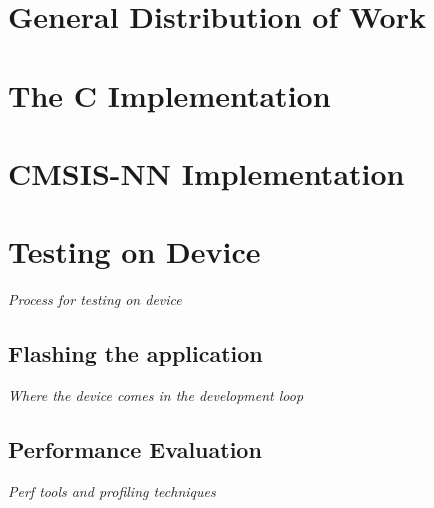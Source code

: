 \section{General Distribution of Work}

\section{The C Implementation}
\textit{}

\section{CMSIS-NN Implementation}
\textit{}

\section{Testing on Device}
\textit{Process for testing on device}

\subsection{Flashing the application}
\textit{Where the device comes in the development loop}

\subsection{Performance Evaluation}
\textit{Perf tools and profiling techniques}

